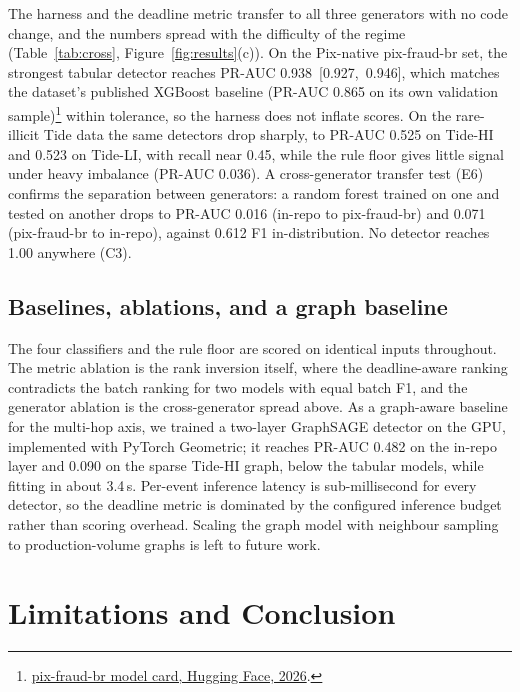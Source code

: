 \documentclass[12pt]{article}
\newcommand{\PfbXgbPRAUC}{0.938}   %
\newcommand{\PfbXgbPRAUClo}{0.927}
\newcommand{\PfbXgbPRAUChi}{0.946}
\newcommand{\PfbPubPRAUC}{0.865}   %
\newcommand{\TideHiXgbPRAUC}{0.525} %
\newcommand{\TideLiXgbPRAUC}{0.523} %
\newcommand{\TideHiRulePRAUC}{0.036}
\newcommand{\TransInPfbPRAUC}{0.016}
\newcommand{\TransPfbInPRAUC}{0.071}
\newcommand{\TransPfbPfbF}{0.612}
\newcommand{\GnnInPRAUC}{0.482}
\newcommand{\GnnTideHiPRAUC}{0.090}
\newcommand{\GnnFitS}{3.4}
\begin{document}
The harness and the deadline metric transfer to all three generators with no
code change, and the numbers spread with the difficulty of the regime
(Table~\ref{tab:cross}, Figure~\ref{fig:results}(c)). On the Pix-native
pix-fraud-br set, the strongest tabular detector reaches PR-AUC
\PfbXgbPRAUC~[\PfbXgbPRAUClo,~\PfbXgbPRAUChi], which matches the dataset's
published XGBoost baseline (PR-AUC \PfbPubPRAUC{} on its own validation
sample)\footnote{\href{https://huggingface.co/datasets/andremessina/pix-fraud-br}{pix-fraud-br model card, Hugging Face, 2026}.}
within tolerance, so the harness does not inflate scores. On the rare-illicit
Tide data the same detectors drop sharply, to PR-AUC \TideHiXgbPRAUC{} on Tide-HI
and \TideLiXgbPRAUC{} on Tide-LI, with recall near 0.45, while the rule floor
gives little signal under heavy imbalance (PR-AUC \TideHiRulePRAUC{}). A
cross-generator transfer test (E6) confirms the separation between generators: a
random forest trained on one and tested on another drops to PR-AUC
\TransInPfbPRAUC{} (in-repo to pix-fraud-br) and \TransPfbInPRAUC{}
(pix-fraud-br to in-repo), against \TransPfbPfbF{} F1 in-distribution. No
detector reaches 1.00 anywhere (C3).

\subsection{Baselines, ablations, and a graph baseline}

The four classifiers and the rule floor are scored on identical inputs
throughout. The metric ablation is the rank inversion itself, where the
deadline-aware ranking contradicts the batch ranking for two models with equal
batch F1, and the generator ablation is the cross-generator spread above. As a
graph-aware baseline for the multi-hop axis, we trained a two-layer GraphSAGE
detector on the GPU, implemented with PyTorch Geometric; it reaches PR-AUC
\GnnInPRAUC{} on the in-repo layer and \GnnTideHiPRAUC{} on the sparse Tide-HI
graph, below the tabular models, while fitting in about \GnnFitS{}\,s. Per-event
inference latency is sub-millisecond for every detector, so the deadline metric
is dominated by the configured inference budget rather than scoring overhead.
Scaling the graph model with neighbour sampling to production-volume graphs is
left to future work.

\section{Limitations and Conclusion}\label{sec:concl}
\end{document}
